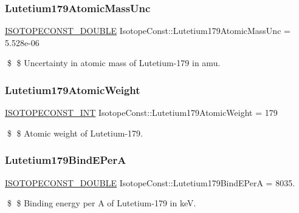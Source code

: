 \subsubsection{\texorpdfstring{Lutetium179\+Atomic\+Mass\+Unc}{Lutetium179AtomicMassUnc}}
{\footnotesize\ttfamily \mbox{\hyperlink{group___isotope_const-_macros_ga8f45a7272ce02c0b4c65c44636ed719a}{I\+S\+O\+T\+O\+P\+E\+C\+O\+N\+S\+T\+\_\+\+D\+O\+U\+B\+LE}} Isotope\+Const\+::\+Lutetium179\+Atomic\+Mass\+Unc = 5.\+528e-\/06}

\$ \$ Uncertainty in atomic mass of Lutetium-\/179 in amu. \mbox{\label{group___isotope_const-_lutetium-_lu179_ga83b3acfd77776cd5270e45a99feca401}} 
\subsubsection{\texorpdfstring{Lutetium179\+Atomic\+Weight}{Lutetium179AtomicWeight}}
{\footnotesize\ttfamily \mbox{\hyperlink{group___isotope_const-_macros_ga5f18360b3e99483a35c32d789e62621c}{I\+S\+O\+T\+O\+P\+E\+C\+O\+N\+S\+T\+\_\+\+I\+NT}} Isotope\+Const\+::\+Lutetium179\+Atomic\+Weight = 179}

\$ \$ Atomic weight of Lutetium-\/179. \mbox{\label{group___isotope_const-_lutetium-_lu179_gaf3dbb08963d11a4c04f65ce1ba6c59bc}} 
\subsubsection{\texorpdfstring{Lutetium179\+Bind\+E\+PerA}{Lutetium179BindEPerA}}
{\footnotesize\ttfamily \mbox{\hyperlink{group___isotope_const-_macros_ga8f45a7272ce02c0b4c65c44636ed719a}{I\+S\+O\+T\+O\+P\+E\+C\+O\+N\+S\+T\+\_\+\+D\+O\+U\+B\+LE}} Isotope\+Const\+::\+Lutetium179\+Bind\+E\+PerA = 8035.}

\$ \$ Binding energy per A of Lutetium-\/179 in keV. \mbox{\label{group___isotope_const-_lutetium-_lu179_gaabbc632f56737bf2042f3bd681065949}} 
